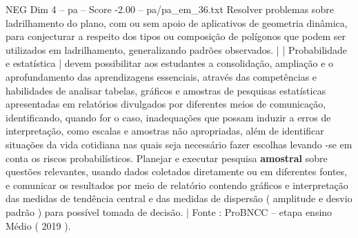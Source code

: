 \begin{textsample}{NEG Dim 4 – pa – Score -2.00 – pa/pa\_em\_36.txt}
Resolver problemas sobre ladrilhamento do plano, com ou sem apoio de aplicativos de geometria dinâmica, para conjecturar a respeito dos tipos ou composição de polígonos que podem ser utilizados em ladrilhamento, generalizando padrões observados. | | Probabilidade e estatística | devem possibilitar aos estudantes a consolidação, ampliação e o aprofundamento das aprendizagens essenciais, através das competências e habilidades de analisar tabelas, gráficos e amostras de pesquisas estatísticas apresentadas em relatórios divulgados por diferentes meios de comunicação, identificando, quando for o caso, inadequações que possam induzir a erros de interpretação, como escalas e amostras não apropriadas, além de identificar situações da vida cotidiana nas quais seja necessário fazer escolhas levando -se em conta os riscos probabilísticos.
Planejar e executar pesquisa \textbf{amostral} sobre questões relevantes, usando dados coletados diretamente ou em diferentes fontes, e comunicar os resultados por meio de relatório contendo gráficos e interpretação das medidas de tendência central e das medidas de dispersão ( amplitude e desvio padrão ) para possível tomada de decisão. | Fonte : ProBNCC – etapa ensino Médio ( 2019 ).

\end{textsample}
